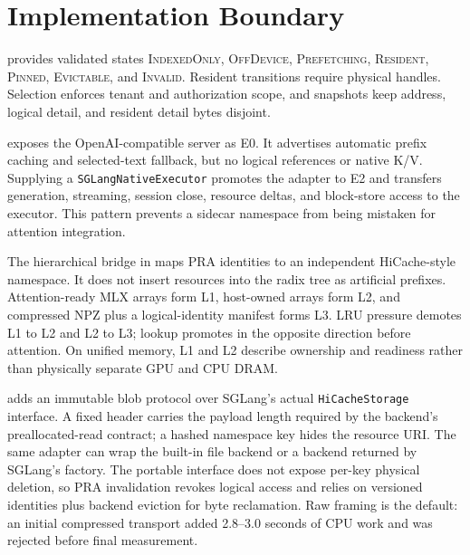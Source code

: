\documentclass[10pt]{article}
\begin{document}
\section{Implementation Boundary}
 provides validated states
\textsc{IndexedOnly}, \textsc{OffDevice}, \textsc{Prefetching},
\textsc{Resident}, \textsc{Pinned}, \textsc{Evictable}, and
\textsc{Invalid}. Resident transitions require physical handles. Selection
enforces tenant and authorization scope, and snapshots keep address, logical
detail, and resident detail bytes disjoint.

 exposes the OpenAI-compatible server as E0.
It advertises automatic prefix caching and selected-text fallback, but no
logical references or native K/V. Supplying a \texttt{SGLangNativeExecutor}
promotes the adapter to E2 and transfers generation, streaming, session close,
resource deltas, and block-store access to the executor. This pattern prevents
a sidecar namespace from being mistaken for attention integration.

The hierarchical bridge in  maps PRA identities
to an independent HiCache-style namespace. It does not insert resources into
the radix tree as artificial prefixes. Attention-ready MLX arrays form L1,
host-owned arrays form L2, and compressed NPZ plus a logical-identity manifest
forms L3. LRU pressure demotes L1 to L2 and L2 to L3; lookup promotes in the
opposite direction before attention. On unified memory, L1 and L2 describe
ownership and readiness rather than physically separate GPU and CPU DRAM.

 adds an immutable blob protocol over
SGLang's actual \texttt{HiCacheStorage} interface. A fixed header carries the
payload length required by the backend's preallocated-read contract; a hashed
namespace key hides the resource URI. The same adapter can wrap the built-in
file backend or a backend returned by SGLang's factory. The portable interface
does not expose per-key physical deletion, so PRA invalidation revokes logical
access and relies on versioned identities plus backend eviction for byte
reclamation. Raw framing is the default: an initial compressed transport added
2.8--3.0 seconds of CPU work and was rejected before final measurement.
\end{document}
